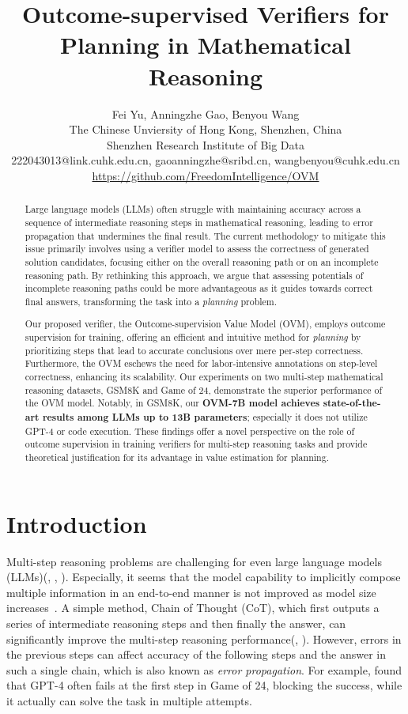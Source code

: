\documentclass[11pt]{article}
\title{  Outcome-supervised Verifiers for Planning in Mathematical Reasoning}
\author{Fei Yu, Anningzhe Gao, Benyou Wang \\
  The Chinese Unviersity of Hong Kong, Shenzhen, China \\
  Shenzhen Research Institute of Big Data \\
  222043013@link.cuhk.edu.cn, gaoanningzhe@sribd.cn,  wangbenyou@cuhk.edu.cn \\
  \url{https://github.com/FreedomIntelligence/OVM}
  }
\theoremstyle{plain}
\theoremstyle{claim}
\theoremstyle{rethinking}
\theoremstyle{researchquestion}
\theoremstyle{findings}
\theoremstyle{fact}
\theoremstyle{proper}
\theoremstyle{remark}
\begin{document}
\maketitle




\begin{abstract}


Large language models (LLMs) often struggle with maintaining accuracy across a sequence of intermediate reasoning steps in mathematical reasoning, leading to error propagation that undermines the final result. The current methodology to mitigate this issue primarily involves using a verifier model to assess the correctness of generated solution candidates, focusing either on the overall reasoning path or on an incomplete reasoning path. By rethinking this approach, we argue that assessing potentials of incomplete reasoning paths could be more advantageous as it guides towards correct final answers, transforming the task into a \textit{planning} problem.


Our proposed verifier, the Outcome-supervision Value Model (OVM), employs outcome supervision for training, offering an efficient and intuitive method for \textit{planning} by prioritizing steps that lead to accurate conclusions over mere per-step correctness. Furthermore, the OVM eschews the need for labor-intensive annotations on step-level correctness, enhancing its scalability. Our experiments on two multi-step mathematical reasoning datasets, GSM8K and Game of 24, demonstrate the superior performance of the OVM model. Notably, in GSM8K, our \textbf{OVM-7B model achieves state-of-the-art results among LLMs up to  13B parameters}; especially it does not utilize GPT-4 or code execution. These findings offer a novel perspective on the role of outcome supervision in training verifiers for multi-step reasoning tasks and provide theoretical justification for its advantage in value estimation for planning.
\end{abstract}





\section{Introduction}

Multi-step reasoning problems are challenging for even large language models (LLMs)(\citealp{selection-inference23}, \citealp{compositionality-gap22}, \citealp{cot22}). Especially, it seems that the model capability to implicitly compose multiple information in an end-to-end manner is not improved as model size increases~\citep{compositionality-gap22}. A simple method, Chain of Thought (CoT), which first outputs a series of intermediate reasoning steps and then finally the answer, can significantly improve the multi-step reasoning performance(\citealp{cot22}, \citealp{cot-bbh23}). However, errors in the previous steps can affect accuracy of the following steps and the answer in such a single chain,  which is also known as \textit{error propagation}. For example, \citet{tot23} found that GPT-4 often fails at the first step in Game of 24, blocking the success, while it actually can solve the task in multiple attempts.  
\end{document}
